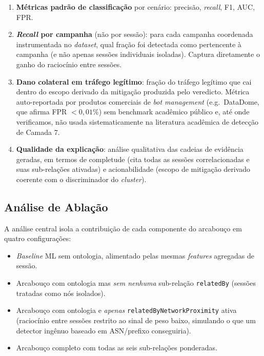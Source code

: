 \documentclass[preprint,12pt]{elsarticle}
\begin{document}
\begin{enumerate}
    \item \textbf{Métricas padrão de classificação} por cenário: precisão, \emph{recall}, F1, AUC, FPR.
    \item \textbf{\emph{Recall} por campanha} (não por sessão): para cada campanha coordenada instrumentada no \emph{dataset}, qual fração foi detectada como pertencente à campanha (e não apenas sessões individuais isoladas). Captura diretamente o ganho do raciocínio entre sessões.
    \item \textbf{Dano colateral em tráfego legítimo}: fração do tráfego legítimo que cai dentro do escopo derivado da mitigação produzida pelo veredicto. Métrica auto-reportada por produtos comerciais de \emph{bot management} (e.g.~DataDome, que afirma FPR $< 0{,}01\%$) sem benchmark acadêmico público e, até onde verificamos, não usada sistematicamente na literatura acadêmica de detecção de Camada 7.
    \item \textbf{Qualidade da explicação}: análise qualitativa das cadeias de evidência geradas, em termos de completude (cita todas as sessões correlacionadas e suas sub-relações ativadas) e acionabilidade (escopo de mitigação derivado coerente com o discriminador do \emph{cluster}).
\end{enumerate}

\subsection{Análise de Ablação}
\label{sec:ablation}

A análise central isola a contribuição de cada componente do arcabouço em quatro configurações:

\begin{itemize}
    \item[\textbf{(a)}] \emph{Baseline} ML sem ontologia, alimentado pelas mesmas \emph{features} agregadas de sessão.
    \item[\textbf{(b)}] Arcabouço com ontologia mas \emph{sem nenhuma} sub-relação \texttt{relatedBy} (sessões tratadas como nós isolados).
    \item[\textbf{(c)}] Arcabouço com ontologia e \emph{apenas} \texttt{relatedByNetworkProximity} ativa (raciocínio entre sessões restrito ao sinal de peso baixo, simulando o que um detector ingênuo baseado em ASN/prefixo conseguiria).
    \item[\textbf{(d)}] Arcabouço completo com todas as seis sub-relações ponderadas.
\end{itemize}
\end{document}
